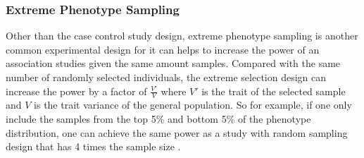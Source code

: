 	\subsubsection{Extreme Phenotype Sampling}
	Other than the case control study design, extreme phenotype sampling is another common experimental design for it can helps to increase the power of an association studies given the same amount samples.
	Compared with the same number of randomly selected individuals, the extreme selection design can increase the power by a factor of $\frac{V'}{V}$ where $V'$ is the trait of the selected sample and $V$ is the trait variance of the general population.
	So for example, if one only include the samples from the top 5\% and bottom 5\% of the phenotype distribution, one can achieve the same power as a study with random sampling design that has 4 times the sample size \citep{Sham2014}. 
	
